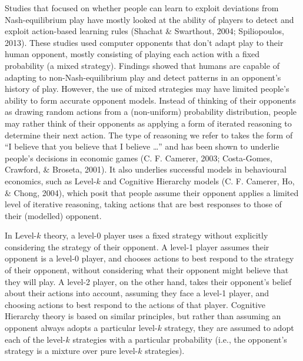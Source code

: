 \documentclass[
  english,
  man,floatsintext]{apa6}
\begin{document}
Studies that focused on whether people can learn to exploit deviations from Nash-equilibrium play have mostly looked at the ability of players to detect and exploit action-based learning rules (Shachat \& Swarthout, 2004; Spiliopoulos, 2013). These studies used computer opponents that don't adapt play to their human opponent, mostly consisting of playing each action with a fixed probability (a mixed strategy). Findings showed that humans are capable of adapting to non-Nash-equilibrium play and detect patterns in an opponent's history of play. However, the use of mixed strategies may have limited people's ability to form accurate opponent models.
Instead of thinking of their opponents as drawing random actions from a (non-uniform) probability distribution, people may rather think of their opponents as applying a form of iterated reasoning to determine their next action. The type of reasoning we refer to takes the form of ``I believe that you believe that I believe \ldots{}'' and has been shown to underlie people's decisions in economic games (C. F. Camerer, 2003; Costa-Gomes, Crawford, \& Broseta, 2001). It also underlies successful models in behavioural economics, such as Level-\(k\) and Cognitive Hierarchy models (C. F. Camerer, Ho, \& Chong, 2004), which posit that people assume their opponent applies a limited level of iterative reasoning, taking actions that are best responses to those of their (modelled) opponent.

In Level-\(k\) theory, a level-0 player uses a fixed strategy without explicitly considering the strategy of their opponent. A level-1 player assumes their opponent is a level-0 player, and chooses actions to best respond to the strategy of their opponent, without considering what their opponent might believe that they will play. A level-2 player, on the other hand, takes their opponent's belief about their actions into account, assuming they face a level-1 player, and choosing actions to best respond to the actions of that player. Cognitive Hierarchy theory is based on similar principles, but rather than assuming an opponent always adopts a particular level-\(k\) strategy, they are assumed to adopt each of the level-\(k\) strategies with a particular probability (i.e., the opponent's strategy is a mixture over pure level-\(k\) strategies).
\end{document}
